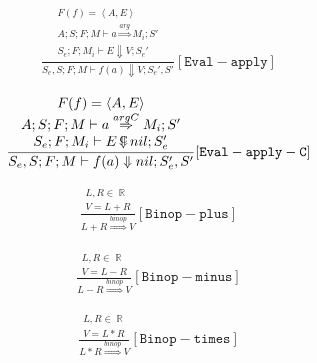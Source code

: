 \documentclass{scrartcl}
\DeclareMathOperator{\numtype}{\mathbb{R}}
\DeclareMathOperator{\ceval}{\overset{C}{\smash{\Downarrow}}}
\begin{document}
    \begin{align*}
    \frac{
        \begin{matrix}
        F(f) = \left< A, E \right> \\
        A; S; F; M \vdash a \overset{arg}{\Rightarrow} M_i; S' \\
        S_e; F; M_i \vdash E \Downarrow V; S_e'
        \end{matrix}
    }{
        S_e, S; F; M \vdash f(a) \Downarrow V; S_e', S'
    }[\mathtt{Eval-apply}]
    \end{align*}
    
    \begin{align*}
    \frac{
        \begin{matrix}
        F(f) = \left< A, E \right> \\
        A; S; F; M \vdash a \overset{argC}{\Rightarrow} M_i; S' \\
        S_e; F; M_i \vdash E  \ceval nil; S_e'
        \end{matrix}
    }{
        S_e, S; F; M \vdash f(a) \Downarrow nil; S_e', S'
    }[\mathtt{Eval-apply-C}]
    \end{align*}
    
    \begin{align*}
    \frac{
        \begin{matrix}
        L, R \in \numtype \\
        V = L + R
        \end{matrix}
    }{
        L + R \overset{binop}{\Rightarrow} V
    }[\mathtt{Binop-plus}]
    \end{align*}
    
    \begin{align*}
    \frac{
        \begin{matrix}
        L, R \in \numtype \\
        V = L - R
        \end{matrix}
    }{
        L - R \overset{binop}{\Rightarrow} V
    }[\mathtt{Binop-minus}]
    \end{align*}
    
    \begin{align*}
    \frac{
        \begin{matrix}
        L, R \in \numtype \\
        V = L * R
        \end{matrix}
    }{
        L * R \overset{binop}{\Rightarrow} V
    }[\mathtt{Binop-times}]
    \end{align*}
    
\end{document}
